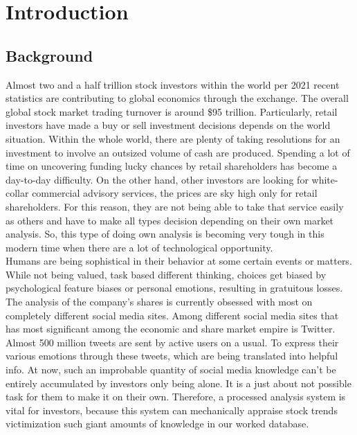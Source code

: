\chapter{Introduction}
\section{Background}
Almost two and a half trillion stock investors within the world per 2021 recent statistics are contributing to global economics through the exchange. The overall global stock market trading turnover is around \$95 trillion. Particularly, retail investors have made a buy or sell investment decisions depends on the world situation. Within the whole world, there are plenty of taking resolutions for an investment to involve an outsized volume of cash are produced. Spending a lot of time on uncovering funding lucky chances by retail shareholders has become a day-to-day difficulty. On the other hand, other investors are looking for white-collar commercial advisory services, the prices are sky high only for retail shareholders. For this reason, they are not being able to take that service easily as others and have to make all types decision depending on their own market analysis. So, this type of doing own analysis is becoming very tough in this modern time when there are a lot of technological opportunity.\\

Humans are being sophistical in their behavior at some certain events or matters. While not being valued, task based different thinking, choices get biased by psychological feature biases or personal emotions, resulting in gratuitous losses. The analysis of the company’s shares is currently obsessed with most on completely different social media sites. Among different social media sites that has most significant among the economic and share market empire is Twitter. Almost 500 million tweets are sent by active users on a usual. To express their various emotions through these tweets, which are being translated into helpful info. At now, such an improbable quantity of social media knowledge can’t be entirely accumulated by investors only being alone. It is a just about not possible task for them to make it on their own. Therefore, a processed analysis system is vital for investors, because this system can mechanically appraise stock trends victimization such giant amounts of knowledge in our worked database.\cite{bhavya2021stock}\\ 

